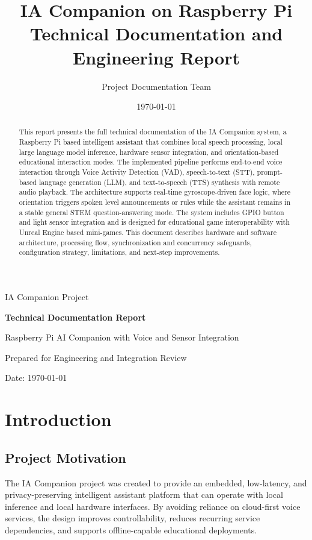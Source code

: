 \documentclass[12pt,a4paper]{article}
\title{IA Companion on Raspberry Pi\\\large Technical Documentation and Engineering Report}
\author{Project Documentation Team}
\date{\today}
\begin{document}
\begin{titlepage}
    \centering
    {\Large IA Companion Project \par}
    \vspace{1.5cm}
    {\huge \textbf{Technical Documentation Report}\par}
    \vspace{1cm}
    {\Large Raspberry Pi AI Companion with Voice and Sensor Integration\par}
    \vspace{2cm}
    {\large Prepared for Engineering and Integration Review\par}
    \vfill
    {\large Date: \today\par}
\end{titlepage}

\begin{abstract}
This report presents the full technical documentation of the IA Companion system, a Raspberry Pi based intelligent assistant that combines local speech processing, local large language model inference, hardware sensor integration, and orientation-based educational interaction modes. The implemented pipeline performs end-to-end voice interaction through Voice Activity Detection (VAD), speech-to-text (STT), prompt-based language generation (LLM), and text-to-speech (TTS) synthesis with remote audio playback. The architecture supports real-time gyroscope-driven face logic, where orientation triggers spoken level announcements or rules while the assistant remains in a stable general STEM question-answering mode. The system includes GPIO button and light sensor integration and is designed for educational game interoperability with Unreal Engine based mini-games. This document describes hardware and software architecture, processing flow, synchronization and concurrency safeguards, configuration strategy, limitations, and next-step improvements.
\end{abstract}

\tableofcontents
\newpage

\section{Introduction}

\subsection{Project Motivation}
The IA Companion project was created to provide an embedded, low-latency, and privacy-preserving intelligent assistant platform that can operate with local inference and local hardware interfaces. By avoiding reliance on cloud-first voice services, the design improves controllability, reduces recurring service dependencies, and supports offline-capable educational deployments.
\end{document}
